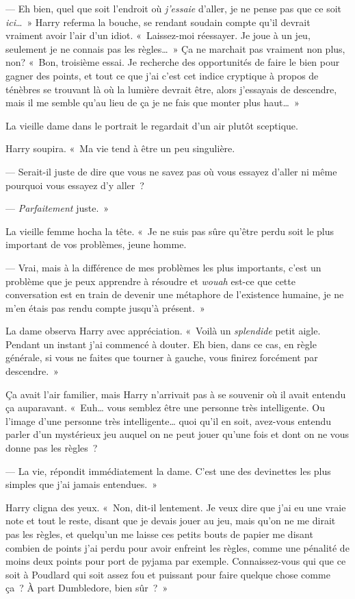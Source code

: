 --- Eh bien, quel que soit l'endroit où \emph{j'essaie} d'aller, je ne pense pas que ce soit \emph{ici}…~» Harry referma la bouche, se rendant soudain compte qu'il devrait vraiment avoir l'air d'un idiot.
«~Laissez-moi réessayer. Je joue à un jeu, seulement je ne connais pas les règles…~»
Ça ne marchait pas vraiment non plus, non?
«~Bon, troisième essai.
Je recherche des opportunités de faire le bien pour gagner des points, et tout ce que j'ai c'est cet indice cryptique à propos de ténèbres se trouvant là où la lumière devrait être, alors j'essayais de descendre, mais il me semble qu'au lieu de ça je ne fais que monter plus haut…~»

La vieille dame dans le portrait le regardait d'un air plutôt sceptique.

Harry soupira.
«~Ma vie tend à être un peu singulière.

--- Serait-il juste de dire que vous ne savez pas où vous essayez d'aller ni même pourquoi vous essayez d'y aller~?

--- \emph{Parfaitement} juste.~»

La vieille femme hocha la tête.
«~Je ne suis pas sûre qu'être perdu soit le plus important de vos problèmes, jeune homme.

--- Vrai, mais à la différence de mes problèmes les plus importants, c'est un problème que je peux apprendre à résoudre et \emph{wouah} est-ce que cette conversation est en train de devenir une métaphore de l'existence humaine, je ne m'en étais pas rendu compte jusqu'à présent.~»

La dame observa Harry avec appréciation. «~Voilà un \emph{splendide} petit aigle. Pendant un instant j'ai commencé à douter. Eh bien, dans ce cas, en règle générale, si vous ne faites que tourner à gauche, vous finirez forcément par descendre.~»

Ça avait l'air familier, mais Harry n'arrivait pas à se souvenir où il avait entendu ça auparavant. «~Euh… vous semblez être une personne très intelligente.
Ou l'image d'une personne très intelligente… quoi qu'il en soit, avez-vous entendu parler d'un mystérieux jeu auquel on ne peut jouer qu'une fois et dont on ne vous donne pas les règles~?

--- La vie, répondit immédiatement la dame.
C'est une des devinettes les plus simples que j'ai jamais entendues.~»

Harry cligna des yeux. «~Non, dit-il lentement. Je veux dire que j'ai eu une vraie note et tout le reste, disant que je devais jouer au jeu, mais qu'on ne me dirait pas les règles, et quelqu'un me laisse ces petits bouts de papier me disant combien de points j'ai perdu pour avoir enfreint les règles, comme une pénalité de moins deux points pour port de pyjama par exemple.
Connaissez-vous qui que ce soit à Poudlard qui soit assez fou et puissant pour faire quelque chose comme ça~?
À part Dumbledore, bien sûr~?~»

